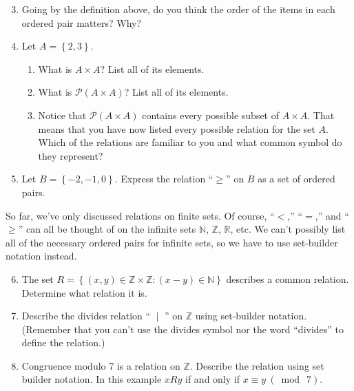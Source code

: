 \documentclass[12 pt]{article}
\newcommand{\R}{\mathbb{R}}
\newcommand{\Z}{\mathbb{Z}}
\newcommand{\N}{\mathbb{N}}
\renewcommand{\P}{\mathscr{P}}
\newcommand{\set}[1]{\left\{#1\right\}}
\newcommand{\divides}{\! \mid \!}
\newcommand{\mymod}[1]{ \ (\bmod \ #1)}
\theoremstyle{definition}
\theoremstyle{plain}
\theoremstyle{mytheorem}
\theoremstyle{myexample}
\theoremstyle{mydefinition}
\begin{document}
\begin{enumerate} \setcounter{enumi}{2}
\item Going by the definition above, do you think the order of the items in each ordered pair matters?  Why?

\vspace{1.5in} 

\item Let $A = \set{2,3}$.
	\begin{enumerate}
	\item What is $A \times A$?  List all of its elements.
	\newpage
	\item What is $\P(A \times A)$?  List all of its elements.
	
	\vspace{5in}
	
	\item Notice that $\P(A \times A)$ contains every possible subset of $A \times A$.  That means that you have now listed every possible relation for the set $A$.  Which of the relations are familiar to you and what common symbol do they represent?
	

	
	\end{enumerate}
	\newpage
	
\item Let $B=\set{-2,-1,0}$.  Express the relation ``$ \geq$'' on $B$ as a set of ordered pairs.

\vspace{2in}
\end{enumerate}

So far, we've only discussed relations on finite sets.  Of course, ``$<$,'' ``$=$,'' and ``$\geq$'' can all be thought of on the infinite sets $\N$, $\Z$, $\R$, etc.  We can't possibly list all of the necessary ordered pairs for infinite sets, so we have to use set-builder notation instead.

\begin{enumerate} \setcounter{enumi}{5}
\item The set $R= \set{(x,y) \in \Z \times \Z: (x-y)\in \N}$ describes a common relation.  Determine what relation it is.

\vspace{1in}

\item Describe the divides relation `` $\divides$ '' on $\Z$ using set-builder notation.  (Remember that you can't use the divides symbol nor the word ``divides'' to define the relation.)

\vspace{1.5in}

\item Congruence modulo 7 is a relation on $\Z$.  Describe the relation using set builder notation.  In this example $xRy$ if and only if $x \equiv y \mymod{7}$.

\vspace{1.5in}
\end{enumerate}
\end{document}
